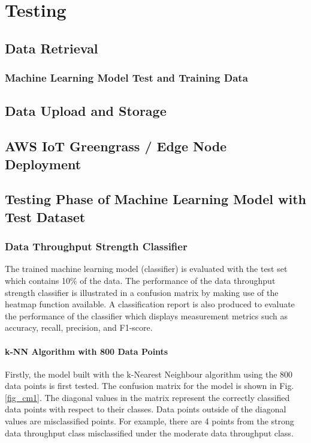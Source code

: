 \chapter{Testing} \label{Chapter: Testing}


\section{Data Retrieval}



\subsection{Machine Learning Model Test and Training Data}


\section{Data Upload and Storage}

\section{AWS IoT Greengrass / Edge Node Deployment}

\section{Testing Phase of Machine Learning Model with Test Dataset}
\subsection{Data Throughput Strength Classifier}
The trained machine learning model (classifier) is evaluated with the test set which contains 10\% of the data. The performance of the data throughput strength classifier is illustrated in a confusion matrix by making use of the heatmap function available. A classification report is also produced to evaluate the performance of the classifier which displays measurement metrics such as accuracy, recall, precision, and F1-score. 

\subsubsection{k-NN Algorithm with 800 Data Points}
Firstly, the model built with the k-Nearest Neighbour algorithm using the 800 data points is first tested. The confusion matrix for the model is shown in Fig. \ref{fig_cm1}. The diagonal values in the matrix represent the correctly classified data points with respect to their classes. Data points outside of the diagonal values are misclassified points. For example, there are 4 points from the strong data throughput class misclassified under the moderate data throughput class. 

